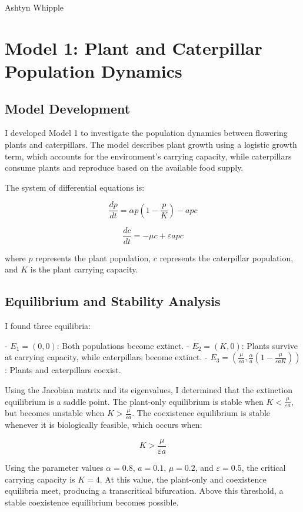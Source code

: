 \documentclass{article}
\begin{document}
\noindent Ashtyn Whipple

\section{Model 1: Plant and Caterpillar Population Dynamics}

\subsection{Model Development}

I developed Model 1 to investigate the population dynamics between flowering plants and caterpillars. The model describes plant growth using a logistic growth term, which accounts for the environment's carrying capacity, while caterpillars consume plants and reproduce based on the available food supply.

The system of differential equations is:

\[
\frac{dp}{dt}=\alpha p\left(1-\frac{p}{K}\right)-apc
\]

\[
\frac{dc}{dt}=-\mu c+\varepsilon apc
\]

where \(p\) represents the plant population, \(c\) represents the caterpillar population, and \(K\) is the plant carrying capacity.

\subsection{Equilibrium and Stability Analysis}

I found three equilibria:

- \(E_1=(0,0)\): Both populations become extinct.
- \(E_2=(K,0)\): Plants survive at carrying capacity, while caterpillars become extinct.
- \(E_3=\left(\frac{\mu}{\varepsilon a},\frac{\alpha}{a}\left(1-\frac{\mu}{\varepsilon aK}\right)\right)\): Plants and caterpillars coexist.

Using the Jacobian matrix and its eigenvalues, I determined that the extinction equilibrium is a saddle point. The plant-only equilibrium is stable when \(K<\frac{\mu}{\varepsilon a}\), but becomes unstable when \(K>\frac{\mu}{\varepsilon a}\). The coexistence equilibrium is stable whenever it is biologically feasible, which occurs when:

\[
K>\frac{\mu}{\varepsilon a}
\]

Using the parameter values \(\alpha=0.8\), \(a=0.1\), \(\mu=0.2\), and \(\varepsilon=0.5\), the critical carrying capacity is \(K=4\). At this value, the plant-only and coexistence equilibria meet, producing a transcritical bifurcation. Above this threshold, a stable coexistence equilibrium becomes possible.
\end{document}
